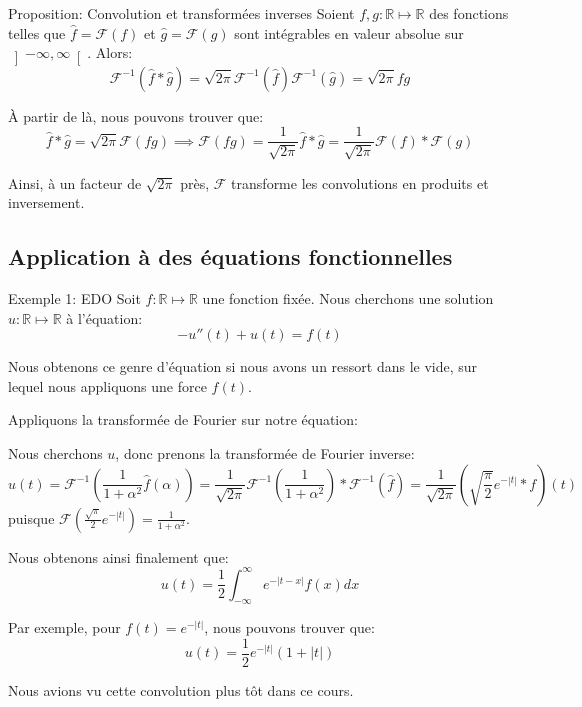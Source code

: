 \documentclass[a4paper]{article}
\begin{document}
\begin{parag}{Proposition: Convolution et transformées inverses}
    Soient $f, g: \mathbb{R} \mapsto \mathbb{R}$ des fonctions telles que $\hat{f} = \mathcal{F}\left(f\right)$ et $\hat{g} = \mathcal{F}\left(g\right)$ sont intégrables en valeur absolue sur $\left]-\infty, \infty\right[ $. Alors: 
    \[\mathcal{F}^{-1}\left(\hat{f} * \hat{g}\right) = \sqrt{2\pi} \mathcal{F}^{-1}\left(\hat{f}\right) \mathcal{F}^{-1}\left(\hat{g}\right) = \sqrt{2\pi} fg\]

    À partir de là, nous pouvons trouver que: 
    \[\hat{f} * \hat{g} = \sqrt{2\pi} \mathcal{F} \left(fg\right) \implies \mathcal{F}\left(fg\right) = \frac{1}{\sqrt{2\pi}} \hat{f} * \hat{g} = \frac{1}{\sqrt{2\pi}} \mathcal{F}\left(f\right) * \mathcal{F}\left(g\right)\]

    Ainsi, à un facteur de $\sqrt{2\pi}$ près, $\mathcal{F}$ transforme les convolutions en produits et inversement.
\end{parag}

\subsection{Application à des équations fonctionnelles}

\begin{parag}{Exemple 1: EDO}
    Soit $f: \mathbb{R} \mapsto \mathbb{R}$ une fonction fixée. Nous cherchons une solution $u: \mathbb{R} \mapsto \mathbb{R}$ à l'équation: 
    \[-u''\left(t\right) + u\left(t\right) = f\left(t\right)\]

    Nous obtenons ce genre d'équation si nous avons un ressort dans le vide, sur lequel nous appliquons une force $f\left(t\right)$.

    Appliquons la transformée de Fourier sur notre équation: 
    
    Nous cherchons $u$, donc prenons la transformée de Fourier inverse: 
    \[u\left(t\right) = \mathcal{F}^{-1} \left(\frac{1}{1 + \alpha ^2} \hat{f}\left(\alpha\right)\right) = \frac{1}{\sqrt{2\pi}} \mathcal{F}^{-1}\left(\frac{1}{1 + \alpha ^2}\right) * \mathcal{F}^{-1}\left(\hat{f}\right) = \frac{1}{\sqrt{2\pi}} \left(\sqrt{\frac{\pi}{2}} e^{-\left|t\right|} * f\right)\left(t\right)\]
    puisque $\mathcal{F}\left(\frac{\sqrt{\pi}}{2} e^{-\left|t\right|}\right) = \frac{1}{1 + \alpha ^2}$.
    
    Nous obtenons ainsi finalement que: 
    \[u\left(t\right) = \frac{1}{2} \int_{-\infty}^{\infty} e^{-\left|t-x\right|}f\left(x\right)dx\]
    
    Par exemple, pour $f\left(t\right) = e^{-\left|t\right|}$, nous pouvons trouver que: 
    \[u\left(t\right) = \frac{1}{2} e^{-\left|t\right|} \left(1 + \left|t\right|\right)\]

    Nous avions vu cette convolution plus tôt dans ce cours.
\end{parag}
\end{document}
